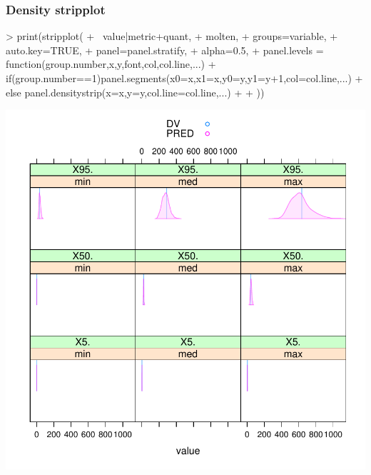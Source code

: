 \subsubsection{Density stripplot}
\begin{Schunk}
\begin{Sinput}
> print(stripplot(
+ 	~value|metric+quant,
+ 	molten,
+ 	groups=variable,
+ 	auto.key=TRUE,
+ 	panel=panel.stratify,
+ 	alpha=0.5,
+ 	panel.levels = function(group.number,x,y,font,col,col.line,...){
+ 		if(group.number==1)panel.segments(x0=x,x1=x,y0=y,y1=y+1,col=col.line,...)
+ 		else panel.densitystrip(x=x,y=y,col.line=col.line,...)
+ 	}
+ ))
\end{Sinput}
\end{Schunk}
\includegraphics{model1-boa}
